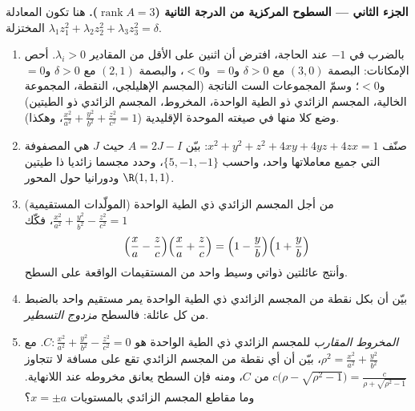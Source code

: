 \begin{problem}
\medskip
\noindent\textbf{الجزء الثاني --- السطوح المركزية من الدرجة الثانية
($\operatorname{rank}A = 3$).} هنا تكون المعادلة المختزلة $\lambda_1z_1^2 + \lambda_2z_2^2 + \lambda_3z_3^2 = \delta$.
\begin{enumerate}[resume]
  \item بالضرب في $-1$ عند الحاجة، افترض أن اثنين على الأقل من
        المقادير $\lambda_i > 0$. أحص الإمكانات: البصمة $(3, 0)$ مع $\delta > 0$
        و$= 0$ و$< 0$، والبصمة $(2, 1)$ مع $\delta > 0$ و$= 0$ و$<
        0$؛
        وسمّ المجموعات الست الناتجة (المجسم الإهليلجي، النقطة،
        المجموعة الخالية، المجسم الزائدي ذو الطية الواحدة، المخروط،
        المجسم الزائدي ذو الطيتين) وضع كلا منها في صيغته الموحدة
        الإقليدية ($\frac{x^2}{a^2} + \frac{y^2}{b^2} +
        \frac{z^2}{c^2} = 1$، وهكذا).
  \item صنّف $x^2 + y^2 + z^2 + 4xy + 4yz + 4zx = 1$: بيّن $A = 2J - I$ حيث $J$ هي المصفوفة التي جميع
        معاملاتها واحد، واحسب  $\{5, -1, -1\}$، وحدد مجسما زائديا ذا
        طيتين ودورانيا حول المحور $\R(1,1,1)$.
  \item (المولّدات المستقيمية) من أجل المجسم الزائدي ذي الطية
        الواحدة $\frac{x^2}{a^2} + \frac{y^2}{b^2} - \frac{z^2}{c^2}
        = 1$، فكّك
        \[
        \Bigl(\frac xa - \frac zc\Bigr)
        \Bigl(\frac xa + \frac zc\Bigr)
        = \Bigl(1 - \frac yb\Bigr)\Bigl(1 + \frac yb\Bigr)
        \]
        وأنتج عائلتين ذواتي وسيط واحد من المستقيمات الواقعة على
        السطح.
  \item بيّن أن بكل نقطة من المجسم الزائدي ذي الطية الواحدة يمر
        مستقيم واحد بالضبط من كل عائلة: فالسطح \emph{مزدوج التسطير}.
  \item \emph{المخروط المقارب} للمجسم الزائدي ذي الطية الواحدة هو
        $C : \frac{x^2}{a^2} + \frac{y^2}{b^2}
        - \frac{z^2}{c^2} = 0$. مع $\rho^2 = \frac{x^2}{a^2}
        + \frac{y^2}{b^2}$، بيّن أن أي نقطة من المجسم الزائدي تقع
        على مسافة لا تتجاوز $c\bigl(\rho -
        \sqrt{\rho^2 - 1}\bigr) = \frac{c}{\rho +
        \sqrt{\rho^2 - 1}}$ من $C$، ومنه فإن السطح يعانق
        مخروطه عند اللانهاية. وما مقاطع المجسم الزائدي بالمستويات
        $x = \pm a$؟
\end{enumerate}


\end{problem}
